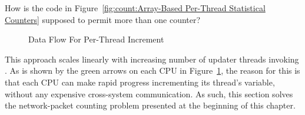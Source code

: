 \QuickQuiz{}
	How is the code in
	Figure~\ref{fig:count:Array-Based Per-Thread Statistical Counters}
	supposed to permit more than one counter?
 \QuickQuizEnd

\begin{figure}[tb]
\begin{center}
\end{center}
\caption{Data Flow For Per-Thread Increment}
\label{fig:count:Data Flow For Per-Thread Increment}
\end{figure}

This approach scales linearly with increasing number of updater threads
invoking .
As is shown by the green arrows on each CPU in
Figure~\ref{fig:count:Data Flow For Per-Thread Increment},
the reason for this is that each CPU can make rapid progress incrementing
its thread's variable, without any expensive cross-system communication.
As such, this section solves the network-packet counting problem presented
at the beginning of this chapter.

